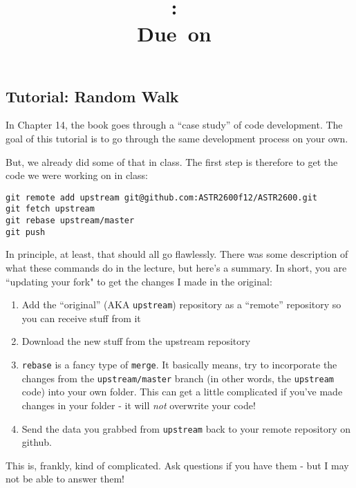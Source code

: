 \documentclass{article}
\title{\vspace{2in}\textmd{\textbf{\hmwkClass:\ \hmwkTitle}}\\\normalsize\vspace{0.1in}\small{Due\ on\ \hmwkDueDate}\\\vspace{0.1in}\large{}\vspace{3in}}
\date{}
\begin{document}
\begin{spacing}{1.0}
\newpage



\section{Tutorial:  Random Walk }

In Chapter 14, the book goes through a “case study” of code development. The
goal of this tutorial is to go through the same development process on your
own. 

But, we already did some of that in class.  The first step is therefore to
get the code we were working on in class:\\
\begin{lstlisting}
git remote add upstream git@github.com:ASTR2600f12/ASTR2600.git
git fetch upstream
git rebase upstream/master
git push
\end{lstlisting}
In principle, at least, that should all go flawlessly.  There was some
description of what these commands do in the lecture, but here's a summary.  In
short, you are “updating your fork" to get the changes I made in the original:
\begin{enumerate}
    \item Add the “original” (AKA \texttt{upstream}) repository as a “remote”
        repository so you can receive stuff from it 
    \item Download the new stuff from the upstream repository
    \item \texttt{rebase} is a fancy type of \texttt{merge}.  It basically
        means, try to incorporate the changes from the \texttt{upstream/master}
        branch (in other words, the \texttt{upstream} code) into your own
        folder.  This can get a little complicated if you've made changes in
        your folder - it will \emph{not} overwrite your code!
    \item Send the data you grabbed from \texttt{upstream} back to your remote
        repository on github.
\end{enumerate}
This is, frankly, kind of complicated.  Ask questions if you have them - but
I may not be able to answer them!




\end{spacing}
\end{document}
